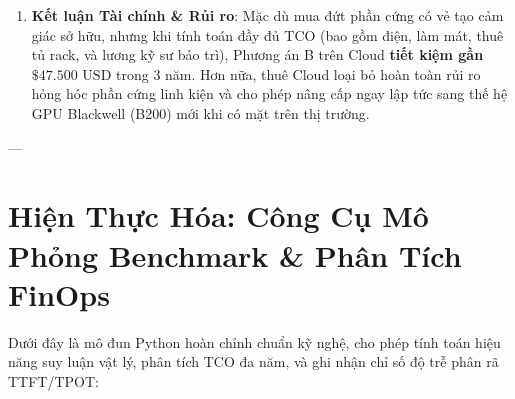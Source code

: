 \begin{example}
\begin{enumerate}
  \item \textbf{Kết luận Tài chính \& Rủi ro}:
    Mặc dù mua đứt phần cứng có vẻ tạo cảm giác sở hữu, nhưng khi tính toán đầy đủ TCO (bao gồm điện, làm mát, thuê tủ rack, và lương kỹ sư bảo trì), Phương án B trên Cloud \textbf{tiết kiệm gần $\$47.500\text{ USD}$} trong 3 năm. Hơn nữa, thuê Cloud loại bỏ hoàn toàn rủi ro hỏng hóc phần cứng linh kiện và cho phép nâng cấp ngay lập tức sang thế hệ GPU Blackwell (B200) mới khi có mặt trên thị trường.
\end{enumerate}
\end{example}

---

\section{Hiện Thực Hóa: Công Cụ Mô Phỏng Benchmark \& Phân Tích FinOps}
\label{sec:implementation-finops}

Dưới đây là mô đun Python hoàn chỉnh chuẩn kỹ nghệ, cho phép tính toán hiệu năng suy luận vật lý, phân tích TCO đa năm, và ghi nhận chỉ số độ trễ phân rã TTFT/TPOT:

